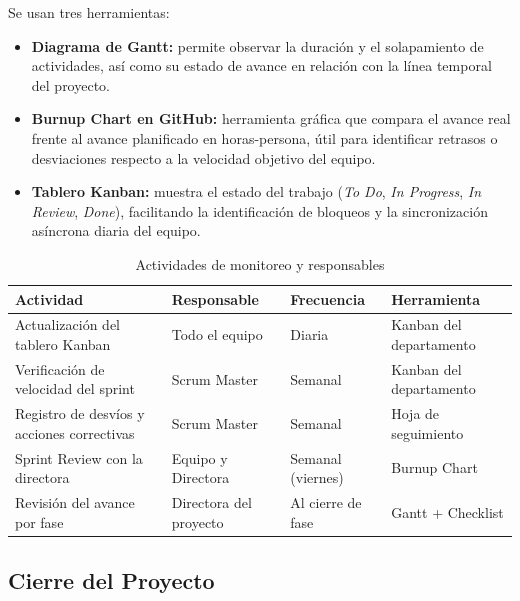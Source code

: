\documentclass{article}
\begin{document}
Se usan tres herramientas:

\begin{itemize}
    \item \textbf{Diagrama de Gantt:} permite observar la duración y el
    solapamiento de actividades, así como su estado de avance en relación
    con la línea temporal del proyecto.

    \item \textbf{Burnup Chart en GitHub:} herramienta gráfica que compara
    el avance real frente al avance planificado en horas-persona, útil para
    identificar retrasos o desviaciones respecto a la velocidad objetivo del equipo.

    \item \textbf{Tablero Kanban:} muestra el estado del
    trabajo (\textit{To Do}, \textit{In Progress}, \textit{In Review},
    \textit{Done}), facilitando la identificación de bloqueos y la
    sincronización asíncrona diaria del equipo.
\end{itemize}

\begin{table}[H]
\centering
\small
\begin{tabular}{|p{4.5cm}|p{3cm}|p{2.5cm}|p{3.5cm}|}
\hline
\textbf{Actividad} & \textbf{Responsable} & \textbf{Frecuencia} & \textbf{Herramienta} \\ \hline

Actualización del tablero Kanban & Todo el equipo & Diaria & Kanban del departamento \\ \hline

Verificación de velocidad del sprint &  Scrum Master & Semanal & Kanban del departamento \\ \hline

Registro de desvíos y acciones correctivas & Scrum Master & Semanal & Hoja de seguimiento \\ \hline

Sprint Review con la directora & Equipo y Directora & Semanal (viernes) & Burnup Chart \\ \hline

Revisión del avance por fase & Directora del proyecto & Al cierre de fase & Gantt + Checklist \\ \hline

\end{tabular}
\caption{Actividades de monitoreo y responsables}
\label{tab:monitoreo_control}
\end{table}


\subsection{Cierre del Proyecto}
\end{document}
